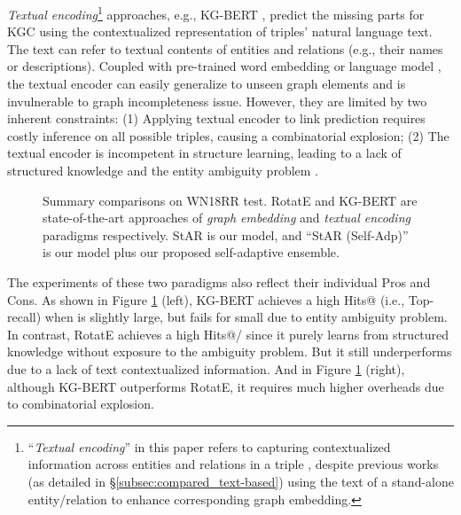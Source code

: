 \documentclass[sigconf]{acmart}
\begin{document}
\textit{Textual encoding}\footnote{``\textit{Textual encoding}'' in this paper refers to capturing contextualized information across entities and relations in a triple \cite{yao2019kgbert},
despite previous works (as detailed in \S \ref{subsec:compared_text-based}) using the text of a stand-alone entity/relation to enhance corresponding graph embedding.} approaches, e.g., KG-BERT \cite{yao2019kgbert}, predict the missing parts for KGC using the contextualized representation of triples' natural language text.  
The text can refer to textual contents of entities and relations (e.g., their names or descriptions). 
Coupled with pre-trained word embedding \cite{mikolov2013distributed,pennington2014glove} or language model \cite{BERT,RoBERTa}, the textual encoder can easily generalize to unseen graph elements and is invulnerable to graph incompleteness issue. 
However, they are limited by two inherent constraints: 
(1) Applying textual encoder to link prediction requires costly inference on all possible triples, causing a combinatorial explosion; (2) The textual encoder is incompetent in structure learning, leading to a lack of structured knowledge and the entity ambiguity problem \cite{Cucerzan2007disambiguation}. 


\begin{figure}
    \vspace{-9mm}
	\caption{\small Summary comparisons on WN18RR test. RotatE and KG-BERT are state-of-the-art approaches of \textit{graph embedding} and \textit{textual encoding} paradigms respectively. 
	StAR is our model, and ``StAR (Self-Adp)'' is our model plus our proposed self-adaptive ensemble.
	}
	\label{fig:intro_illustration} 
\end{figure}

The experiments of these two paradigms also reflect their individual Pros and Cons. 
As shown in Figure \ref{fig:intro_illustration} (left), KG-BERT achieves a high Hits@ (i.e., Top- recall) when  is slightly large, but fails for small  due to entity ambiguity problem. In contrast, RotatE achieves a high Hits@/ since it purely learns from structured knowledge without exposure to the ambiguity problem. But it still underperforms due to a lack of text contextualized information. 
And in Figure \ref{fig:intro_illustration} (right), although KG-BERT outperforms RotatE, it requires much higher overheads due to combinatorial explosion.
\end{document}
